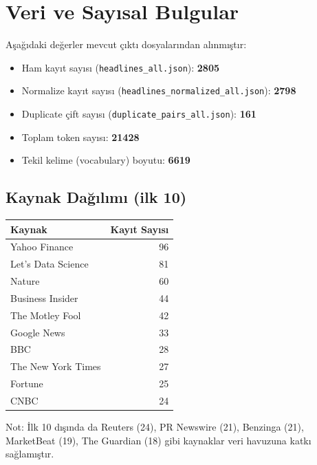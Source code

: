 \documentclass[12pt,a4paper]{article}
\begin{document}
\section{Veri ve Say\i{}sal Bulgular}
A\c{s}a\u{g}\i{}daki de\u{g}erler mevcut \c{c}\i{}kt\i{} dosyalar\i{}ndan al\i{}nm\i{}\c{s}t\i{}r:
\begin{itemize}
    \item Ham kay\i{}t say\i{}s\i{} (\texttt{headlines\_all.json}): \textbf{2805}
    \item Normalize kay\i{}t say\i{}s\i{} (\texttt{headlines\_normalized\_all.json}): \textbf{2798}
    \item Duplicate \c{c}ift say\i{}s\i{} (\texttt{duplicate\_pairs\_all.json}): \textbf{161}
    \item Toplam token say\i{}s\i{}: \textbf{21428}
    \item Tekil kelime (vocabulary) boyutu: \textbf{6619}
\end{itemize}

\subsection{Kaynak Da\u{g}\i{}l\i{}m\i{} (ilk 10)}
\begin{center}
\begin{tabular}{lr}
\toprule
Kaynak & Kay\i{}t Say\i{}s\i{} \\
\midrule
Yahoo Finance & 96 \\
Let's Data Science & 81 \\
Nature & 60 \\
Business Insider & 44 \\
The Motley Fool & 42 \\
Google News & 33 \\
BBC & 28 \\
The New York Times & 27 \\
Fortune & 25 \\
CNBC & 24 \\
\bottomrule
\end{tabular}
\end{center}

\noindent
Not: \.{I}lk 10 d\i{}\c{s}\i{}nda da Reuters (24), PR Newswire (21), Benzinga (21), MarketBeat (19), The Guardian (18) gibi kaynaklar veri havuzuna katk\i{} sa\u{g}lam\i{}\c{s}t\i{}r.
\end{document}
